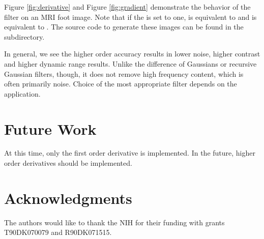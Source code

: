 \documentclass{InsightArticle}
\begin{document}
Figure \ref{fig:derivative} and Figure \ref{fig:gradient} demonstrate the behavior of the filter on an MRI foot
image.  Note that if the  is set to one,
 is equivalent to
 and
 is equivalent to
.  The source code to generate
these images can be found in the  subdirectory.

In general, we see the higher order accuracy results in lower noise, higher
contrast and higher dynamic range results.  Unlike the difference of Gaussians
or recursive Gaussian filters, though, it does not remove high frequency
content, which is often primarily noise.  Choice of the most appropriate filter
depends on the application.

\section{Future Work}

At this time, only the first order derivative is implemented.  In the future,
higher order derivatives should be implemented.

\section{Acknowledgments}

The authors would like to thank the NIH for their funding with grants
T90DK070079 and R90DK071515.



\end{document}
